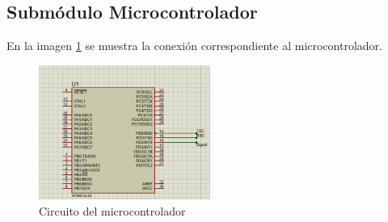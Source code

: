 \subsection{Submódulo Microcontrolador}
En la imagen \ref{fig:CircuitoMicro} se muestra la conexión correspondiente al microcontrolador.

\begin{figure}[H]
	\centering
	\includegraphics[width=0.5\textwidth]{Capitulo4/hardware/images/CircuitoMicrocontrolador}
	\caption{Circuito del microcontrolador}
	\label{fig:CircuitoMicro}
\end{figure}